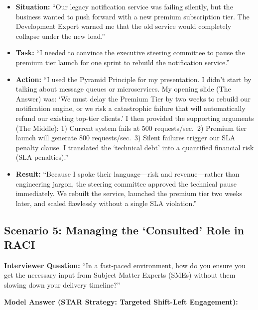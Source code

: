 \begin{itemize}
\tightlist
\item
  \textbf{Situation:} ``Our legacy notification service was failing
  silently, but the business wanted to push forward with a new premium
  subscription tier. The Development Expert warned me that the old
  service would completely collapse under the new load.''
\item
  \textbf{Task:} ``I needed to convince the executive steering committee
  to pause the premium tier launch for one sprint to rebuild the
  notification service.''
\item
  \textbf{Action:} ``I used the Pyramid Principle for my presentation. I
  didn't start by talking about message queues or microservices. My
  opening slide (The Answer) was: `We must delay the Premium Tier by two
  weeks to rebuild our notification engine, or we risk a catastrophic
  failure that will automatically refund our existing top-tier clients.'
  I then provided the supporting arguments (The Middle): 1) Current
  system fails at 500 requests/sec.~2) Premium tier launch will generate
  800 requests/sec.~3) Silent failures trigger our SLA penalty clause. I
  translated the `technical debt' into a quantified financial risk (SLA
  penalties).''
\item
  \textbf{Result:} ``Because I spoke their language---risk and
  revenue---rather than engineering jargon, the steering committee
  approved the technical pause immediately. We rebuilt the service,
  launched the premium tier two weeks later, and scaled flawlessly
  without a single SLA violation.''
\end{itemize}

\subsection{Scenario 5: Managing the `Consulted' Role in
RACI}\label{scenario-5-managing-the-consulted-role-in-raci}

\textbf{Interviewer Question:} ``In a fast-paced environment, how do you
ensure you get the necessary input from Subject Matter Experts (SMEs)
without them slowing down your delivery timeline?''

\textbf{Model Answer (STAR Strategy: Targeted Shift-Left Engagement):}

